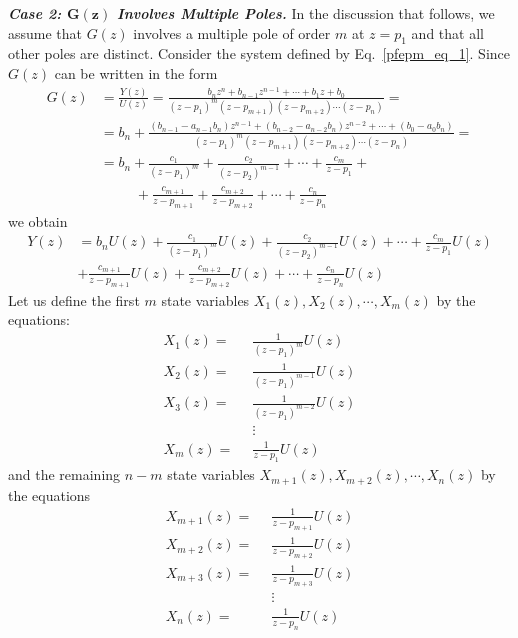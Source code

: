 \documentclass[11pt,a4paper,oneside]{book}
\numberwithin{equation}{section}
\theoremstyle{it}
\theoremstyle{definition}
\begin{document}
\vspace{5mm}
\noindent\textbf{\textit{Case 2: $\mathbf{G(z)}$ Involves Multiple Poles.}}
In the discussion that follows, we assume that $G(z)$ involves a multiple pole of order $m$ at $z=p_1$ and that all other poles are distinct.
Consider the system defined by Eq.~\eqref{pfepm_eq_1}. Since $G(z)$ can be 
written in the form 
\begin{equation}\label{pfepm_eq_12}
	\begin{aligned}
		G(z)&=\frac{Y(z)}{U(z)} = \frac{b_nz^n+b_{n-1}z^{n-1}+ \cdots +b_1z+b_0}{(z-p_1)^m(z-p_{m+1})(z-p_{m+2})\cdots(z-p_n)} = \\[8pt]
		&= b_n+\frac{(b_{n-1}-a_{n-1}b_n)z^{n-1}+(b_{n-2}-a_{n-2}b_n)z^{n-2}+\cdots+(b_0-a_0b_n)}{(z-p_1)^m(z-p_{m+1})(z-p_{m+2})\cdots(z-p_n)} = \\[8pt]
		&= b_n + \frac{c_1}{(z-p_1)^m}+\frac{c_2}{(z-p_2)^{m-1}}+\cdots+\frac{c_m}{z-p_1}+ \\[8pt]
		& \quad \quad \enspace + \frac{c_{m+1}}{z-p_{m+1}} +\frac{c_{m+2}}{z-p_{m+2}}+\cdots+\frac{c_{n}}{z-p_{n}}
	\end{aligned}
\end{equation}
we obtain 
\begin{equation}\label{pfepm_eq_13}
	\begin{aligned}
		Y(z) &= b_n U(z) + \frac{c_{1}}{(z-p_{1})^m}U(z)+\frac{c_{2}}{(z-p_{2})^{m-1}}U(z)+\cdots+\frac{c_m}{z-p_1}U(z) \\[6pt] 
		& +\frac{c_{m+1}}{z-p_{m+1}}U(z) +\frac{c_{m+2}}{z-p_{m+2}}U(z) + \cdots +\frac{c_{n}}{z-p_{n}}U(z)
	\end{aligned}
\end{equation}
Let us define the first $m$ state variables $X_1(z), X_2(z),\cdots,X_m(z)$ by the equations:
\begin{equation}\label{pfepm_eq_14}
	\begin{aligned}
		X_1(z)= & \enspace  \frac{1}{(z-p_1)^m}U(z) \\[6pt]
		X_2(z)= & \enspace  \frac{1}{(z-p_1)^{m-1}}U(z) \\[6pt]
		X_3(z)= & \enspace  \frac{1}{(z-p_1)^{m-2}}U(z) \\[6pt]
		& \enspace \vdots \\[6pt]
		X_m(z)= & \enspace  \frac{1}{z-p_1}U(z) 
	\end{aligned}
\end{equation}
and the remaining $n-m$ state variables $X_{m+1}(z),X_{m+2}(z),\cdots,X_n(z)$ by the equations
\begin{equation}\label{pfepm_eq_15}
	\begin{aligned}
		X_{m+1}(z)= & \enspace  \frac{1}{z-p_{m+1}}U(z) \\[6pt]
		X_{m+2}(z)= & \enspace  \frac{1}{z-p_{m+2}}U(z) \\[6pt]
		X_{m+3}(z)= & \enspace  \frac{1}{z-p_{m+3}}U(z) \\[6pt]
		& \enspace \vdots \\[6pt]
		X_n(z)= & \enspace  \frac{1}{z-p_n}U(z) 
	\end{aligned}
\end{equation}
\end{document}
